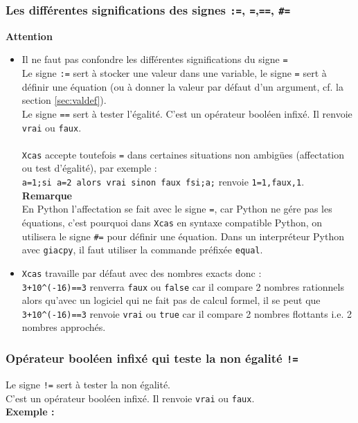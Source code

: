 \documentclass[12pt,a4paper]{book}
\begin{document}
\begin{giacjshere}
\subsubsection{Les diff\'erentes significations des signes {\tt :=}, {\tt =},{\tt ==}, {\tt \#=}}\index{\#=}
{\bf Attention }
\begin{itemize}
\item Il ne faut pas confondre les diff\'erentes significations du signe 
\verb|=|\\
Le signe {\tt :=} sert \`a stocker une valeur dans une variable, le
signe {\tt =} sert \`a d\'efinir une \'equation (ou  \`a donner la valeur par
d\'efaut d'un argument, cf. la section \ref{sec:valdef}).\\ 
Le signe {\tt ==} sert \`a tester l'\'egalit\'e. C'est un op\'erateur bool\'een infix\'e. Il renvoie {\tt vrai} ou {\tt faux}.\\\\
{\tt Xcas} accepte toutefois {\tt =} dans certaines situations non 
ambig\"ues (affectation ou test d'\'egalit\'e), par exemple :\\
{\tt a=1;si a=2 alors vrai sinon faux fsi;a;} renvoie {\tt 1=1,faux,1}.\\
{\bf Remarque} \\
En Python l'affectation se fait avec le signe {\tt =}, car Python ne g\'ere pas 
les \'equations, 
c'est pourquoi dans {\tt Xcas} en syntaxe compatible Python, 
on utilisera le signe {\tt \#=} pour d\'efinir une \'equation. 
Dans  un interpr\'eteur Python avec {\tt giacpy}, il faut utiliser la
commande pr\'efix\'ee {\tt equal}.
\item {\tt Xcas} travaille par d\'efaut avec des nombres exacts donc :\\
{\tt 3+10\verb|^|(-16)==3} renverra {\tt faux} ou {\tt false} car il compare 2 
nombres rationnels alors qu'avec un logiciel qui ne fait pas 
de calcul formel, il se peut que {\tt 3+10\verb|^|(-16)==3} renvoie {\tt vrai} 
ou {\tt true} car il compare 2 nombres flottants i.e.  2 nombres approch\'es.
\end{itemize}

\subsubsection{Op\'erateur bool\'een infix\'e qui teste la non \'egalit\'e {\tt !=}}
Le signe {\tt !=} sert \`a tester la non \'egalit\'e. \\
C'est un op\'erateur bool\'een infix\'e. Il renvoie {\tt vrai} ou {\tt faux}.\\{\bf Exemple :}\\ 
\\
\\


\end{giacjshere}
\end{document}
